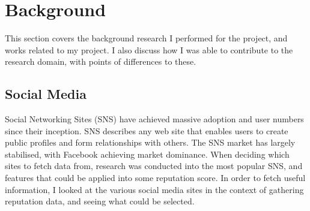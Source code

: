 \chapter{Background}\label{C:us}







This section covers the background research I performed for the project, and works related to my project. I also discuss how I was able to contribute to the research domain, with points of differences to these. 

\section{Social Media}

Social Networking Sites (SNS) have achieved massive adoption and user numbers since their inception. SNS describes any web site that enables users to create public profiles and form relationships with others. The SNS market has largely stabilised, with Facebook achieving market dominance. When deciding which sites to fetch data from, research was conducted into the most popular SNS, and features that could be applied into some reputation score. In order to fetch useful information, I looked at the various social media sites in the context of gathering reputation data, and seeing what could be selected. 







